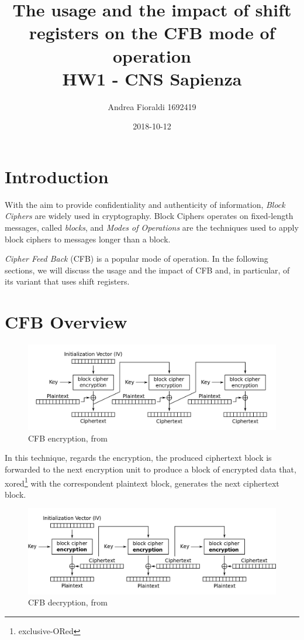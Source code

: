 \documentclass[11pt]{article}
\title{{\bf The usage and the impact of shift registers on the CFB mode of operation} \\ \bigskip \large HW1 - CNS Sapienza}
\date{2018-10-12}
\author{Andrea Fioraldi 1692419}
\begin{document}
\maketitle

\section{Introduction}

With the aim to provide confidentiality and authenticity of information, {\em Block Ciphers} are widely used in cryptography. Block Ciphers operates on fixed-length messages, called {\em blocks}, and {\em Modes of Operations} are the techniques used to apply block ciphers to messages longer than a block.

{\em Cipher Feed Back} (CFB) is a popular mode of operation.
In the following sections, we will discuss the usage and the impact of CFB and, in particular, of its variant that uses shift registers.

\section{CFB Overview}

\begin{figure}[!ht]
  \centering
  \includegraphics[width=1\textwidth]{pic1-hw1-1692419}
  \caption{CFB encryption, from \cite{wiki}}
  \label{fig:cfb_enc}
\end{figure}

In this technique, regards the encryption, the produced ciphertext block is forwarded to the next encryption unit to produce a block of encrypted data that, xored\footnote{exclusive-ORed} with the correspondent plaintext block, generates the next ciphertext block. 

\begin{figure}[!ht]
  \centering
  \includegraphics[width=1\textwidth]{pic2-hw1-1692419}
  \caption{CFB decryption, from \cite{wiki}}
  \label{fig:cfb_dec}
\end{figure}
\end{document}
